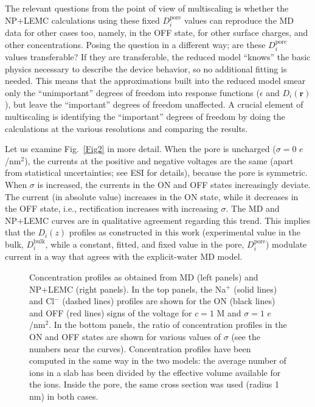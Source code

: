 \documentclass[fleqn,10pt]{SelfArx} %
\begin{document}
The relevant questions from the point of view of multiscaling is whether the NP+LEMC calculations using these fixed $D_{i}^{\mathrm{pore}}$ values can reproduce the MD data for other cases too, namely, in the OFF state, for other surface charges, and other concentrations.
Posing the question in a different way; are these $D_{i}^{\mathrm{pore}}$ values transferable?
If they are transferable, the reduced model ``knows'' the basic physics necessary to describe the device behavior, so no additional fitting is needed.
This means that the approximations built into the reduced model smear only the ``unimportant'' degrees of freedom into response functions ($\epsilon$ and $D_{i}(\mathbf{r})$), but leave the ``important''  degrees of freedom unaffected. 
A crucial element  of multiscaling is identifying the ``important'' degrees of freedom by doing the calculations at the various resolutions and comparing the results.

Let us examine Fig.\ \ref{Fig2} in more detail.
When the pore is uncharged ($\sigma=0$ $e$/nm$^{2}$), the currents at the positive and negative voltages are the same (apart from statistical uncertainties; see ESI for details), because the pore is symmetric.
When $\sigma$ is increased, the currents in the ON and OFF states increasingly deviate. 
The current (in absolute value) increases in the ON state, while it decreases in the OFF state, i.e., rectification increases with increasing $\sigma$.
The MD and NP+LEMC curves are in qualitative agreement regarding this trend.
This implies that the $D_{i}(z)$ profiles as constructed in this work (experimental value in the bulk, $D_{i}^{\mathrm{bulk}}$, while a constant, fitted, and fixed value in the pore, $D_{i}^{\mathrm{pore}}$) modulate current in a way that agrees with the explicit-water MD model. 


\begin{figure*}[t]
 \begin{center}
 \end{center}
\caption{Concentration profiles as obtained from MD (left panels) and NP+LEMC (right panels). In the top panels, the Na$^{+}$ (solid lines) and Cl$^{-}$ (dashed lines) profiles are shown for the ON (black lines) and OFF (red lines) signs of the voltage for $c=1$ M and $\sigma =1$ $e$/nm$^{2}$. 
In the bottom panels, the ratio of concentration profiles in the ON and OFF states are shown for various values of $\sigma$ (see the numbers near the curves).
Concentration profiles have been computed in the same way in the two models: the average number of ions in a slab has been divided by the effective volume available for the ions. Inside the pore, the same cross section was used  (radius 1 nm) in both cases.}
\label{Fig3}
\end{figure*} 
\end{document}
